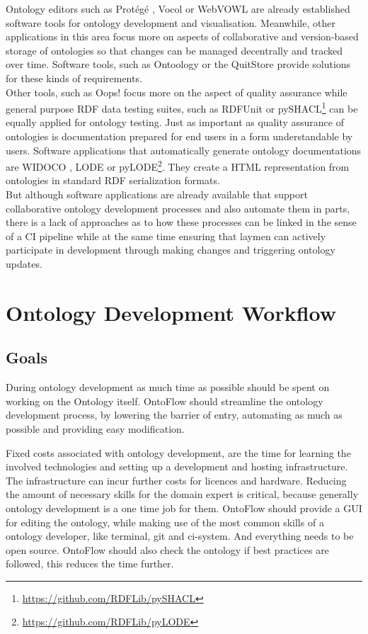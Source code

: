 \documentclass[sigconf]{acmart}
\begin{document}
Ontology editors such as Protégé \cite{protege}, Vocol \cite{halilaj} or WebVOWL \cite{lohmann} are already established software tools for ontology development and visualisation. Meanwhile, other applications in this area focus more on aspects of collaborative and version-based storage of ontologies so that changes can be managed decentrally and tracked over time. Software tools, such as Ontoology \cite{alobaid} or the QuitStore \cite{arndt} provide solutions for these kinds of requirements.\\
Other tools, such as Oops! focus more on the aspect of quality assurance \cite{poveda} while general purpose RDF data testing suites, such as RDFUnit \cite{rdfunit} or pySHACL\footnote{\url{https://github.com/RDFLib/pySHACL}} can be equally applied for ontology testing. Just as important as quality assurance of ontologies is documentation prepared for end users in a form understandable by users. Software applications that automatically generate ontology documentations are WIDOCO \cite{widoco}, LODE \cite{lode} or pyLODE\footnote{\url{https://github.com/RDFLib/pyLODE}}. They create a HTML representation from ontologies in standard RDF serialization formats.\\
But although software applications are already available that support collaborative ontology development processes and also automate them in parts, there is a lack of approaches as to how these processes can be linked in the sense of a CI pipeline while at the same time ensuring that laymen can actively participate in development through making changes and triggering ontology updates.

\section{Ontology Development Workflow}

\subsection{Goals}

During ontology development as much time as possible should be spent on working on the Ontology itself. 
OntoFlow should streamline the ontology development process, by lowering the barrier of entry\todo{}, automating as much as possible and providing easy modification.\todo{}

Fixed costs associated with ontology development, are the time for learning the involved technologies and setting up a development and hosting infrastructure. The infrastructure can incur further costs for licences and hardware.
Reducing the amount of necessary skills for the domain expert is critical, because generally ontology development is a one time job for them.
OntoFlow should provide a GUI for editing the ontology, while making use of the most common skills of a ontology developer, like terminal, git and ci-system. And everything needs to be open source.\todo{}
OntoFlow should also check the ontology if best practices are followed, this reduces the time further.\todo{}
\end{document}
